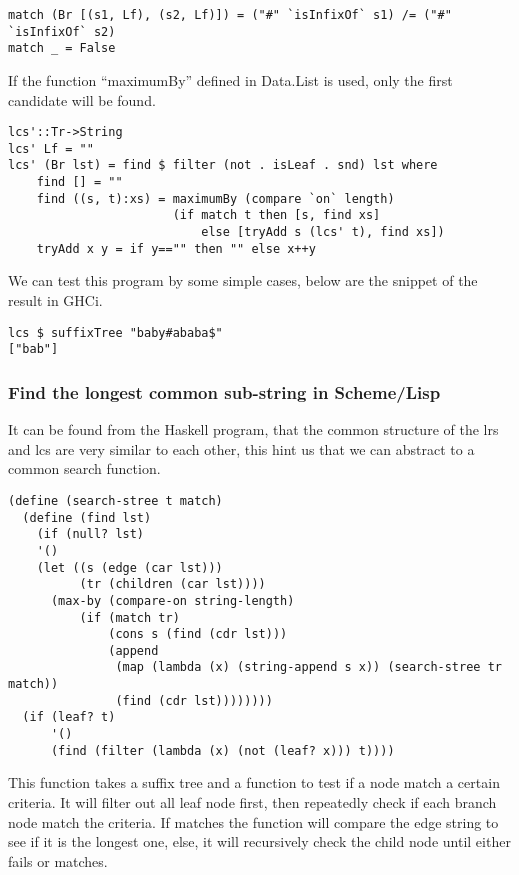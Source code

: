 \documentclass{article}
\begin{document}
\begin{lstlisting}
match (Br [(s1, Lf), (s2, Lf)]) = ("#" `isInfixOf` s1) /= ("#" `isInfixOf` s2)
match _ = False
\end{lstlisting} %

If the function ``maximumBy'' defined in Data.List is used, only
the first candidate will be found.

\begin{lstlisting}
lcs'::Tr->String
lcs' Lf = ""
lcs' (Br lst) = find $ filter (not . isLeaf . snd) lst where
    find [] = ""
    find ((s, t):xs) = maximumBy (compare `on` length) 
                       (if match t then [s, find xs]
                           else [tryAdd s (lcs' t), find xs])
    tryAdd x y = if y=="" then "" else x++y
\end{lstlisting} %

We can test this program by some simple cases, below are the
snippet of the result in GHCi.

\begin{lstlisting}
lcs $ suffixTree "baby#ababa$"
["bab"]
\end{lstlisting}

\subsubsection*{Find the longest common sub-string in Scheme/Lisp}
It can be found from the Haskell program, that the common structure
of the lrs and lcs are very similar to each other, this hint us
that we can abstract to a common search function.

\lstset{language=lisp}
\begin{lstlisting}
(define (search-stree t match)
  (define (find lst)
    (if (null? lst)
	'()
	(let ((s (edge (car lst)))
	      (tr (children (car lst))))
	  (max-by (compare-on string-length) 
		  (if (match tr)
		      (cons s (find (cdr lst)))
		      (append
		       (map (lambda (x) (string-append s x)) (search-stree tr match))
		       (find (cdr lst))))))))
  (if (leaf? t)
      '()
      (find (filter (lambda (x) (not (leaf? x))) t))))
\end{lstlisting}

This function takes a suffix tree and a function to test if a node
match a certain criteria. It will filter out all leaf node first,
then repeatedly check if each branch node match the criteria. If matches
the function will compare the edge string to see if it is the longest one,
else, it will recursively check the child node until either fails or 
matches.
\end{document}
